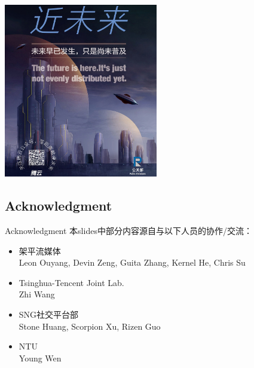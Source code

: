 \documentclass{beamer}
\begin{document}
\begin{frame}
\includegraphics[height=7.6cm]{fig/tengyun.jpg}
\end{frame}
\subsection{Acknowledgment}
\begin{frame}{Acknowledgment}
本slides中部分内容源自与以下人员的协作/交流：
\begin{itemize}
\item 架平流媒体\\
Leon Ouyang, Devin Zeng, Guita Zhang, Kernel He, Chris Su
\item Tsinghua-Tencent Joint Lab.\\ 
Zhi Wang
\item SNG社交平台部\\
Stone Huang, Scorpion Xu, Rizen Guo
\item NTU\\
Young Wen
\end{itemize}
\end{frame}
\end{document}
